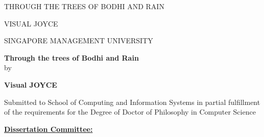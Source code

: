 \documentclass[a4paper,12pt,singleside]{report}
\def\authorname{Visual JOYCE}
\def\titletext{Through the trees of Bodhi and Rain}
\begin{document}
    
\vspace*{2cm}
\thispagestyle{empty}

\begin{center}
{\Large \MakeUppercase{\titletext}}
\end{center}
\vfill
\begin{center}
    {\Large \MakeUppercase{\authorname}}
\end{center}
\vfill
\begin{center}
    {\Large SINGAPORE MANAGEMENT UNIVERSITY}\\
    {\Large \the\year}
\end{center}

\vspace*{2cm}

\begin{titlepage}
\begin{center}

    
\vspace*{2cm}

{\Large \bfseries \titletext}\\[1cm]

{\large by}
\vspace{-3pt}

{\large\bf \authorname}\\[1cm]

\begin{singlespace}
Submitted to School of Computing and Information Systems in partial fulfillment of the requirements for the Degree of Doctor of Philosophy in Computer Science\\[1.5cm]
\end{singlespace}

\vspace*{-0.5cm}
{\bf \underline{Dissertation Committee:}}\\[0.5cm]

\end{center}


\end{titlepage}
\end{document}
